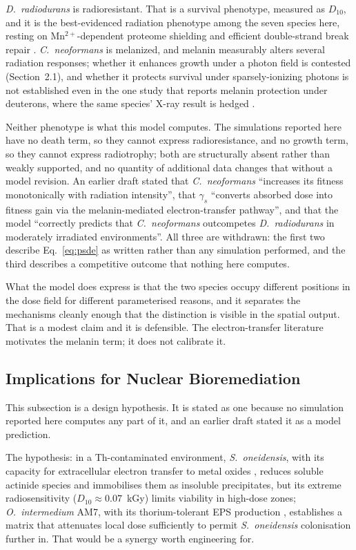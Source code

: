 \documentclass[11pt]{article}
\begin{document}
\textit{D.\ radiodurans} is radioresistant. That is a survival phenotype, measured as $D_{10}$, and
it is the best-evidenced radiation phenotype among the seven species here, resting on
Mn$^{2+}$-dependent proteome shielding and efficient double-strand break repair
\cite{daly2010,slade2011}. \textit{C.\ neoformans} is melanized, and melanin measurably alters
several radiation responses; whether it enhances growth under a photon field is contested
(Section~2.1), and whether it protects survival under sparsely-ionizing photons is not established
even in the one study that reports melanin protection under deuterons, where the same species'
X-ray result is hedged \cite{audit2026}.

Neither phenotype is what this model computes. The simulations reported here have no death term, so
they cannot express radioresistance, and no growth term, so they cannot express radiotrophy; both
are structurally absent rather than weakly supported, and no quantity of additional data changes
that without a model revision. An earlier draft stated that \textit{C.\ neoformans} ``increases its
fitness monotonically with radiation intensity'', that $\gamma_s$ ``converts absorbed dose into
fitness gain via the melanin-mediated electron-transfer pathway'', and that the model ``correctly
predicts that \textit{C.\ neoformans} outcompetes \textit{D.\ radiodurans} in moderately irradiated
environments''. All three are withdrawn: the first two describe Eq.~\ref{eq:psde} as written rather
than any simulation performed, and the third describes a competitive outcome that nothing here
computes.

What the model does express is that the two species occupy different positions in the dose field
for different parameterised reasons, and it separates the mechanisms cleanly enough that the
distinction is visible in the spatial output. That is a modest claim and it is defensible. The
electron-transfer literature \cite{turick2011,casadevall2017} motivates the melanin term; it does
not calibrate it.

\subsection{Implications for Nuclear Bioremediation}

This subsection is a design hypothesis. It is stated as one because no simulation reported here
computes any part of it, and an earlier draft stated it as a model prediction.

The hypothesis: in a Th-contaminated environment, \textit{S.\ oneidensis}, with its capacity for
extracellular electron transfer to metal oxides \cite{heidelberg2002,veeramani2011}, reduces
soluble actinide species and immobilises them as insoluble precipitates, but its extreme
radiosensitivity ($D_{10} \approx 0.07$~kGy) limits viability in high-dose zones;
\textit{O.\ intermedium} AM7, with its thorium-tolerant EPS production \cite{shukla2020},
establishes a matrix that attenuates local dose sufficiently to permit \textit{S.\ oneidensis}
colonisation further in. That would be a synergy worth engineering for.
\end{document}
